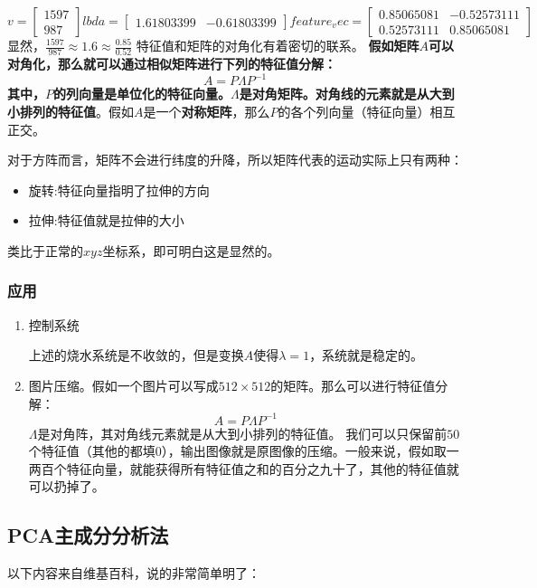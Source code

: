 \documentclass[12pt, letterpaper]{article}
\begin{document}
$$
v = \left[
\begin{matrix}
1597 \\
987
\end{matrix}
\right]
lbda = \left[
\begin{matrix}
1.61803399& -0.61803399
\end{matrix}
\right]
feature_vec = \left[
\begin{matrix}
0.85065081 & -0.52573111 \\
0.52573111 &  0.85065081
\end{matrix}
\right]
$$
显然，$\frac{1597}{987}\approx1.6 \approx \frac{0.85}{0.52}
$
特征值和矩阵的对角化有着密切的联系。
\textbf{
假如矩阵$A$可以对角化，那么就可以通过相似矩阵进行下列的特征值分解：}
\begin{equation}
A=P\Lambda P^{-1}
\end{equation}
\textbf{
其中，$P$的列向量是单位化的特征向量。$\Lambda$是对角矩阵。对角线的元素就是从大到小排列的特征值}。假如$A$是一个\textbf{对称矩阵}，那么$P$的各个列向量（特征向量）相互正交。

对于方阵而言，矩阵不会进行纬度的升降，所以矩阵代表的运动实际上只有两种：
\begin{itemize}
\item 
旋转:特征向量指明了拉伸的方向
\item 
拉伸:特征值就是拉伸的大小
\end{itemize}
类比于正常的$xyz$坐标系，即可明白这是显然的。

\subsubsection*{应用}
\begin{enumerate}
\item 控制系统

上述的烧水系统是不收敛的，但是变换$A$使得$\lambda=1$，系统就是稳定的。
\item 

图片压缩。假如一个图片可以写成$512\times 512$的矩阵。那么可以进行特征值分解：
$$
A=P\Lambda P^{-1}
$$
$\Lambda$是对角阵，其对角线元素就是从大到小排列的特征值。
我们可以只保留前$50$个特征值（其他的都填$0$），输出图像就是原图像的压缩。一般来说，假如取一两百个特征向量，就能获得所有特征值之和的百分之九十了，其他的特征值就可以扔掉了。
\end{enumerate}


\subsection{PCA主成分分析法}
以下内容来自维基百科，说的非常简单明了：
\end{document}
